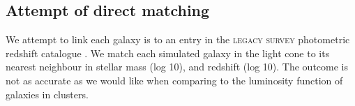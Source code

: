 \documentclass[fleqn,usenatbib,onecolumn]{mnras}
\begin{document}
% 
% 
% 
% 
% 
% 
% 
% 
% 
% 
% 
% 
% 
% 

\subsection{Attempt of direct matching}
We attempt to link each galaxy is to an entry in the \textsc{legacy survey} photometric redshift catalogue \citep{Dey_2019AJ....157..168D,Zou_2019ApJS..242....8Z}. 
We match each simulated galaxy in the light cone to its nearest neighbour in stellar mass (log 10), and redshift (log 10). 
The outcome is not as accurate as we would like when comparing to the luminosity function of galaxies in clusters. 
\end{document}
